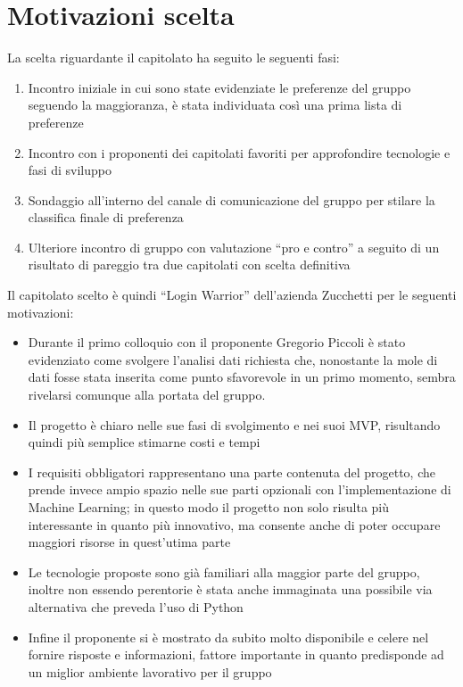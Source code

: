 \section{Motivazioni scelta}
La scelta riguardante il capitolato ha seguito le seguenti fasi:
\begin{enumerate}
	\item Incontro iniziale in cui sono state evidenziate le preferenze del gruppo seguendo la maggioranza, è stata individuata così una prima lista di preferenze
	\item Incontro con i proponenti dei capitolati favoriti per approfondire tecnologie e fasi di sviluppo
	\item Sondaggio all'interno del canale di comunicazione del gruppo per stilare la classifica finale di preferenza
	\item Ulteriore incontro di gruppo con valutazione ``pro e contro'' a seguito di un risultato di pareggio tra due capitolati con scelta definitiva
\end{enumerate}
Il capitolato scelto è quindi ``Login Warrior'' dell'azienda Zucchetti per le seguenti motivazioni:
\begin{itemize}
	\item Durante il primo colloquio con il proponente Gregorio Piccoli è stato evidenziato come svolgere l'analisi dati richiesta che, nonostante la mole di dati fosse stata inserita come punto sfavorevole in un primo momento, sembra rivelarsi comunque alla portata del gruppo.
	\item Il progetto è chiaro nelle sue fasi di svolgimento e nei suoi MVP, risultando quindi più semplice stimarne costi e tempi
	\item I requisiti obbligatori rappresentano una parte contenuta del progetto, che prende invece ampio spazio nelle sue parti opzionali con l'implementazione di Machine Learning; in questo modo il progetto non solo risulta più interessante in quanto più innovativo, ma consente anche di poter occupare maggiori risorse in quest'utima parte
	\item Le tecnologie proposte sono già familiari alla maggior parte del gruppo, inoltre non essendo perentorie è stata anche immaginata una possibile via alternativa che preveda l'uso di Python
	\item Infine il proponente si è mostrato da subito molto disponibile e celere nel fornire risposte e informazioni, fattore importante in quanto predisponde ad un miglior ambiente lavorativo per il gruppo
\end{itemize}